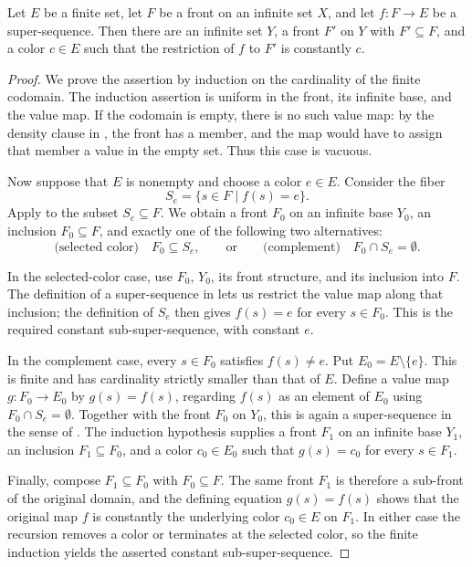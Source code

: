 \begin{theorem}
Let $E$ be a finite set, let $F$ be a front on an infinite set $X$, and let
$f:F\to E$ be a super-sequence.  Then there are an infinite set $Y$, a
front $F'$ on $Y$ with $F'\subseteq F$, and a color $c\in E$ such that the
restriction of $f$ to $F'$ is constantly $c$.
\end{theorem}
\begin{proof}
We prove the assertion by induction on the cardinality of the finite
codomain.  The induction assertion is uniform in the front, its infinite
base, and the value map.  If the codomain is empty, there is no such value
map: by the density clause in , the front has a member, and
the map would have to assign that member a value in the empty set.  Thus this
case is vacuous.

Now suppose that $E$ is nonempty and choose a color $e\in E$.  Consider the
fiber
\[
   S_e=\{s\in F\mid f(s)=e\}.
\]
Apply  to the subset $S_e\subseteq F$.  We obtain a
front $F_0$ on an infinite base $Y_0$, an inclusion $F_0\subseteq F$, and
exactly one of the following two alternatives:
\[
  \text{(selected color)}\quad F_0\subseteq S_e,
  \qquad\text{or}\qquad
  \text{(complement)}\quad F_0\cap S_e=\emptyset.
\]

In the selected-color case, use $F_0$, $Y_0$, its front structure, and its
inclusion into $F$.  The definition of a super-sequence in
 lets us restrict the value map along that inclusion;
the definition of $S_e$ then gives
$f(s)=e$ for every $s\in F_0$.  This is the required constant
sub-super-sequence, with constant $e$.

In the complement case, every $s\in F_0$ satisfies $f(s)\ne e$.  Put
$E_0=E\setminus\{e\}$.  This is finite and has cardinality strictly smaller
than that of $E$.  Define a value map $g:F_0\to E_0$ by
$g(s)=f(s)$, regarding $f(s)$ as an element of $E_0$ using
$F_0\cap S_e=\emptyset$.  Together with the front $F_0$ on $Y_0$, this is
again a super-sequence in the sense of .  The
induction hypothesis supplies a front $F_1$ on an infinite base $Y_1$, an
inclusion $F_1\subseteq F_0$, and a color $c_0\in E_0$ such that
$g(s)=c_0$ for every $s\in F_1$.

Finally, compose $F_1\subseteq F_0$ with $F_0\subseteq F$.  The same front
$F_1$ is therefore a sub-front of the original domain, and the defining
equation $g(s)=f(s)$ shows that the original map $f$ is constantly the
underlying color $c_0\in E$ on $F_1$.  In either case the recursion removes a
color or terminates at the selected color, so the finite induction yields
the asserted constant sub-super-sequence.
\end{proof}
